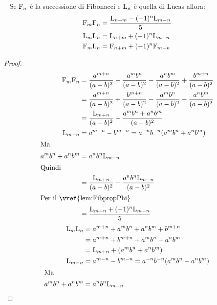 \begin{thm}~\cite{Rabinowitz_1996}\label{thm:FibProdSomma}
	Se $\mathrm{F}_{n}$ è la successione di Fibonacci e  $\mathrm{L}_{n}$ è quella di Lucas allora:
	\begin{align}
		\mathrm{F}_{m}\mathrm{F}_{n}={} & \dfrac{\mathrm{L}_{n+m}-(-1)^n\mathrm{L}_{m-n}}{5}\label{eqn:FibProdSomma} \\
		\mathrm{L}_{m}\mathrm{L}_{n}={} & \mathrm{L}_{n+m}+(-1)^n\mathrm{L}_{m-n}\label{eqn:LucProdSomma}            \\
		\mathrm{F}_{m}\mathrm{L}_{n}={} & \mathrm{F}_{n+m}+(-1)^n\mathrm{F}_{m-n}\label{eqn:LucFibProdSomma}
	\end{align}
\end{thm}
\begin{proof}
	\begin{align*}
		\Fib{m}\Fib{n}={} & \dfrac{a^{m+n}}{(a-b)^2}-\dfrac{a^mb^n}{(a-b)^2}-\dfrac{a^nb^m}{(a-b)^2}+\dfrac{b^{m+n}}{(a-b)^2} \\
		={}               & \dfrac{a^{m+n}}{(a-b)^2}+\dfrac{b^{m+n}}{(a-b)^2}-\dfrac{a^mb^n}{(a-b)^2}-\dfrac{a^nb^m}{(a-b)^2} \\
		={}               & \dfrac{\Luc{m+n}}{(a-b)^2}-\dfrac{a^mb^n+a^nb^m}{(a-b)^2}                                         \\
		\Luc{m-n}={}      & a^{m-n}-b^{m-n}=a^{-n}b^{-n}(a^mb^n+a^nb^m)                                                       \\
		\intertext{Ma}
		a^mb^n+a^nb^m={}  & a^{n}b^{n}\Luc{m-n}                                                                               \\
		\intertext{Quindi}
		={}               & \dfrac{\Luc{m+n}}{(a-b)^2}-\dfrac{a^{n}b^{n}\Luc{m-n}}{(a-b)^2}                                   \\
		\intertext{Per il~\vref{lem:FibpropPhi}}
		={}               & \dfrac{\Luc{m+n}+(-1)^{n}\Luc{m-n}}{5}
	\end{align*}
	\begin{align*}
		\Luc{m}\Luc{n}={} & a^{m+n}+a^mb^n+a^nb^m+b^{m+n}               \\
		={}               & a^{m+n}+b^{m+n}+a^mb^n+a^nb^m               \\
		={}               & \Luc{m+n}+(a^mb^n+a^nb^m)                   \\
		\Luc{m-n}={}      & a^{m-n}-b^{m-n}=a^{-n}b^{-n}(a^mb^n+a^nb^m) \\
		\intertext{Ma}
		a^mb^n+a^nb^m={}  & a^{n}b^{n}\Luc{m-n}                         \\

\end{align*}
\end{proof}
